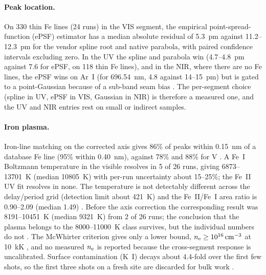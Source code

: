 \paragraph{Peak location.}
On 330 thin Fe lines (24 runs) in the VIS segment, the empirical point-spread-function (ePSF) estimator has a median absolute residual of \SI{5.3}{\pico\metre} against 11.2--\SI{12.3}{\pico\metre} for the vendor spline root and native parabola, with paired confidence intervals excluding zero. In the UV the spline and parabola win (4.7--\SI{4.8}{\pico\metre} against 7.6 for ePSF, on 118 thin Fe lines), and in the NIR, where there are no Fe lines, the ePSF wins on Ar~I (for 696.54~nm, 4.8 against 14--\SI{15}{\pico\metre}) but is gated to a point-Gaussian because of a sub-band seam bias %
. The per-segment choice (spline in UV, ePSF in VIS, Gaussian in NIR) is therefore a measured one, and the UV and NIR entries rest on small or indirect samples.

\paragraph{Iron plasma.}
Iron-line matching on the corrected axis gives 86\% of peaks within \SI{0.15}{\nano\metre} of a database Fe line (95\% within \SI{0.40}{\nano\metre}), against 78\% and 88\% for V %
. A Fe~I Boltzmann temperature in the visible resolves in 5 of 26 runs, giving 6873--\SI{13701}{\kelvin} (median \SI{10805}{\kelvin}) with per-run uncertainty about 15--25\%; the Fe~II UV fit resolves in none. The temperature is not detectably different across the delay/period grid (detection limit about \SI{421}{\kelvin}) and the Fe~II/Fe~I area ratio is 0.90--2.09 (median 1.49) %
. Before the axis correction the corresponding result was 8191--\SI{10451}{\kelvin} (median 9321~K) from 2 of 26 runs; the conclusion that the plasma belongs to the 8000--\SI{11000}{\kelvin} class survives, but the individual numbers do not %
. The McWhirter criterion gives only a lower bound, $n_{\mathrm{e}}\ge10^{16}\,\mathrm{cm^{-3}}$ at \SI{10}{\kilo\kelvin} %
, and no measured $n_{\mathrm{e}}$ is reported because the cross-segment response is uncalibrated. Surface contamination (K~I) decays about 4.4-fold over the first few shots, so the first three shots on a fresh site are discarded for bulk work %
.

